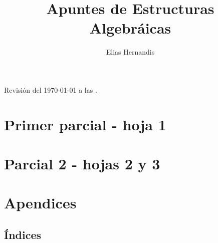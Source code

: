 \documentclass{book}
\title{Apuntes de Estructuras Algebráicas}
\author{Elias Hernandis}
\theoremstyle{definition}
\theoremstyle{remark}
\begin{document}
\maketitle
Revisión del \today $ $ a las \currenttime.

\tableofcontents

\part{Primer parcial - hoja 1}









\part{Parcial 2 - hojas 2 y 3}








\part{Apendices}

\chapter{Índices}

\renewcommand{\listtheoremname}{Lista de definiciones}
\listoftheorems[ignore={thm,ej,pro,cor,obs,lem}]

\renewcommand{\listtheoremname}{Lista de teoremas}
\listoftheorems[onlynamed,ignore={dfn,ej,pro,cor,obs,lem}]

\renewcommand{\listtheoremname}{Lista de ejemplos}
\listoftheorems[onlynamed,ignore={dfn,thm,pro,cor,obs,lem}]



\end{document}
